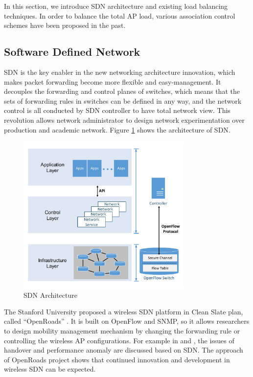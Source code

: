 In this section, we introduce SDN architecture and existing load balancing techniques. In order to balance the total AP load, various association control schemes have been proposed in the past.

\subsection{Software Defined Network}
SDN\cite{mckeown2008openflow} is the key enabler in the new networking architecture innovation, which makes packet forwarding become more flexible and easy-management. It decouples the forwarding and control planes of switches, which means that the sets of forwarding rules in switches can be defined in any way, and the network control is all conducted by SDN controller to have total network view. This revolution allows network administrator to design network experimentation over production and academic network. Figure \ref{fig:SDN-Architecture} shows the architecture of SDN.

\begin{figure}[tbp]
\begin{center}
\includegraphics[width=3.4in]{images/SDN_architecture.pdf}
\end{center}
\caption{SDN Architecture}
\label{fig:SDN-Architecture}
\end{figure}

The Stanford University proposed a wireless SDN platform in Clean Slate plan, called “OpenRoads” \cite{yap2010openroads}. It is built on OpenFlow and SNMP, so it allows researchers to design mobility management mechanism by changing the forwarding rule or controlling the wireless AP configurations. For example in \cite{kim2014seamless} and \cite{dely2013software}, the issues of handover and performance anomaly are discussed based on SDN. The approach of OpenRoads project shows that continued innovation and development in wireless SDN can be expected.



